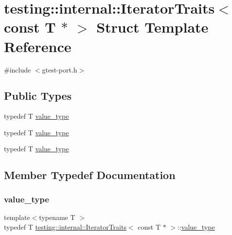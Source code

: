 \hypertarget{structtesting_1_1internal_1_1_iterator_traits_3_01const_01_t_01_5_01_4}{}\section{testing\+::internal\+::Iterator\+Traits$<$ const T $\ast$ $>$ Struct Template Reference}
\label{structtesting_1_1internal_1_1_iterator_traits_3_01const_01_t_01_5_01_4}


{\ttfamily \#include $<$gtest-\/port.\+h$>$}

\subsection*{Public Types}
\begin{DoxyCompactItemize}
\item 
typedef T \mbox{\hyperlink{structtesting_1_1internal_1_1_iterator_traits_3_01const_01_t_01_5_01_4_ae7c8867223e106f374b56a7dc4a85547}{value\+\_\+type}}
\item 
typedef T \mbox{\hyperlink{structtesting_1_1internal_1_1_iterator_traits_3_01const_01_t_01_5_01_4_ae7c8867223e106f374b56a7dc4a85547}{value\+\_\+type}}
\item 
typedef T \mbox{\hyperlink{structtesting_1_1internal_1_1_iterator_traits_3_01const_01_t_01_5_01_4_ae7c8867223e106f374b56a7dc4a85547}{value\+\_\+type}}
\end{DoxyCompactItemize}


\subsection{Member Typedef Documentation}
\mbox{\label{structtesting_1_1internal_1_1_iterator_traits_3_01const_01_t_01_5_01_4_ae7c8867223e106f374b56a7dc4a85547}} 
\subsubsection{\texorpdfstring{value\_type}{value\_type}\hspace{0.1cm}{\footnotesize\ttfamily [1/3]}}
{\footnotesize\ttfamily template$<$typename T $>$ \\
typedef T \mbox{\hyperlink{structtesting_1_1internal_1_1_iterator_traits}{testing\+::internal\+::\+Iterator\+Traits}}$<$ const T $\ast$ $>$\+::\mbox{\hyperlink{structtesting_1_1internal_1_1_iterator_traits_3_01const_01_t_01_5_01_4_ae7c8867223e106f374b56a7dc4a85547}{value\+\_\+type}}}

